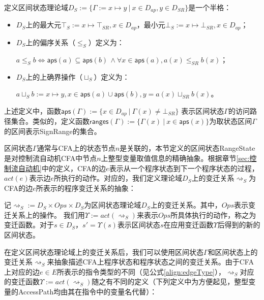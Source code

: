 \begin{definition}
	定义区间状态理论域$ D_S  := \{\Gamma := x \mapsto y ~|~ x \in D_{ap}, y \in D_{SR}  \}  $是一个半格：
	\begin{itemize}
		\item $ D_S $上的最大元$ \top_S  := x \mapsto \top_{SR}, x \in D_{ap} $，最小元$ \bot_S := x \mapsto \bot_{SR}, x \in D_{ap} $；
		
		\item $ D_S $上的偏序关系（$ \le_S $）定义为：\\
		\centerline{$ a \le_S b \iff \mathsf{aps}(a) \subseteq \mathsf{aps}(b) \, \land  \forall x \in \mathsf{aps}(a), a(x) \le_{SR} b(x) $；}
		
		\item $ D_S $上的上确界操作（$ \sqcup_S $）定义为：\\
		\centerline{$ a \sqcup_S b :=  x \mapsto y , x \in \mathsf{aps}(a)  \cup  \mathsf{aps}(b), y = a(x) \sqcup_{SR} b(x)  $。}
	\end{itemize}
\end{definition}

上述定义中，函数$ \mathsf{aps}(\Gamma) := \{x \in D_{ap}~|~ \Gamma(x) \ne \bot_{SR}\} $ 表示区间状态$ \Gamma $的访问路径集合。类似的，定义函数$ \mathsf{ranges}(\Gamma) := \{ \Gamma(x) ~|~x \in \mathsf{aps}(x) \} $为取状态区间$ \Gamma $的区间表示SignRange的集合。

区间状态$ \Gamma $通常与CFA上的状态节点$ n $是关联的，本节定义的区间状态RangeState是对控制流自动机CFA中节点$ n $上整型变量取值信息的精确抽象。根据章节\ref{sec:控制流自动机}中的定义，CFA的边$ e $表示从一个程序状态到下一个程序状态的过程，$ act(e) $表示边$ e $所执行的动作。对应的，我们定义理论域$ D_S $上的变迁关系$ \rightsquigarrow_S $为CFA的边$ e $所表示的程序变迁关系的抽象：
\begin{definition}
	记$ \rightsquigarrow_S := D_S \times Ops \times D_S $为区间状态理论域$ D_S $上的变迁关系。其中，$ Ops $表示变迁关系上的操作。	我们用$ \Upsilon := act(\rightsquigarrow_S) $来表示$ Ops $所具体执行的动作，称之为变迁函数。对于$ s \in D_S $，$ s' = \Upsilon(s) $表示区间状态$ s $在应用变迁函数$ \Upsilon $后得到的新的区间状态。
\end{definition}

在定义区间状态理论域上的变迁关系后，我们可以使用区间状态$ \Gamma $和区间状态上的变迁关系$ \rightsquigarrow_S $来抽象描述CFA上程序状态和程序状态之间的变迁关系。由于CFA上对应的边$ e \in E $所表示的指令类型的不同（见公式\ref{align:edgeType}），$ \rightsquigarrow_S $对应的变迁函数$ \Upsilon := act(\rightsquigarrow_S) $随之有不同的定义（下列定义中为方便起见，整型变量的AccessPath均由其在指令中的变量名代替）：

